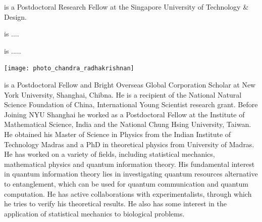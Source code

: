  is a Postdoctoral Research Fellow at the Singapore University of Technology \& Design.


%
%

\begin{center}
\end{center}

 is ....

%
%

\begin{center}
\end{center}

 is .....

%
%

\begin{center}
\texttt{[image: photo\_chandra\_radhakrishnan]}
\end{center}

 is a Postdoctoral Fellow and Bright Overseas Global Corporation Scholar at New York University, Shanghai, Chibna. He is a recipient of the National Natural Science Foundation of China, International Young Scientist research grant. Before Joining NYU Shanghai he worked as a Postdoctoral Fellow at the Institute of Mathematical Science, India and the National Chung Hsing University, Taiwan. He obtained his Master of Science in Physics from the Indian Institute of Technology Madras and a PhD in theoretical physics from University of Madras. He has worked on a variety of fields, including statistical mechanics, mathematical physics and quantum information theory. His fundamental interest in quantum information theory lies in investigating quantum resources alternative to entanglement, which can be used for quantum communication and quantum computation. He has active collaborations with experimentalists, through which he tries to verify his theoretical results. He also has some interest in the application of statistical mechanics to biological problems.

%
%

